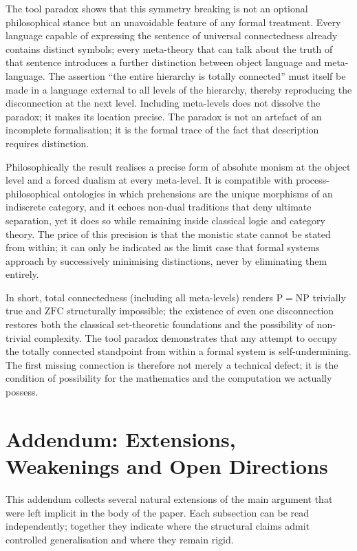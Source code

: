 \documentclass[11pt,a4paper]{article}
\theoremstyle{definition}
\begin{document}
The tool paradox shows that this symmetry breaking is not an optional philosophical stance but an unavoidable feature of any formal treatment. Every language capable of expressing the sentence of universal connectedness already contains distinct symbols; every meta-theory that can talk about the truth of that sentence introduces a further distinction between object language and meta-language. The assertion “the entire hierarchy is totally connected” must itself be made in a language external to all levels of the hierarchy, thereby reproducing the disconnection at the next level. Including meta-levels does not dissolve the paradox; it makes its location precise. The paradox is not an artefact of an incomplete formalisation; it is the formal trace of the fact that description requires distinction.

Philosophically the result realises a precise form of absolute monism at the object level and a forced dualism at every meta-level. It is compatible with process-philosophical ontologies in which prehensions are the unique morphisms of an indiscrete category, and it echoes non-dual traditions that deny ultimate separation, yet it does so while remaining inside classical logic and category theory. The price of this precision is that the monistic state cannot be stated from within; it can only be indicated as the limit case that formal systems approach by successively minimising distinctions, never by eliminating them entirely.

In short, total connectedness (including all meta-levels) renders \(\mathrm{P}=\mathrm{NP}\) trivially true and \(\mathrm{ZFC}\) structurally impossible; the existence of even one disconnection restores both the classical set-theoretic foundations and the possibility of non-trivial complexity. The tool paradox demonstrates that any attempt to occupy the totally connected standpoint from within a formal system is self-undermining. The first missing connection is therefore not merely a technical defect; it is the condition of possibility for the mathematics and the computation we actually possess.

\section*{Addendum: Extensions, Weakenings and Open Directions}

This addendum collects several natural extensions of the main argument that were left implicit in the body of the paper. Each subsection can be read independently; together they indicate where the structural claims admit controlled generalisation and where they remain rigid.
\end{document}
